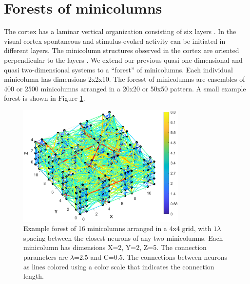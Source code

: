 \section{Forests of minicolumns}
The cortex has a laminar vertical organization consisting of six layers \citep{Strominger2012}.
In the visual cortex spontaneous and stimulus-evoked activity can be initiated in different layers\citep{Sakata2009}.
The minicolumn structures observed in the cortex are oriented perpendicular to the layers \citep{cruz2000}\citep{cruz2005}.
We extend our previous quasi one-dimensional and quasi two-dimensional systems to a ``forest'' of minicolumns.
Each individual minicolumn has dimensions 2x2x10.
The foresst of minicolumns are ensembles of 400 or 2500 minicolumns arranged in a 20x20 or 50x50 pattern.
A small example forest is shown in Figure \ref{fig:forest_structure}.
\begin{figure}[!htb]
 \caption{ Example forest of 16 minicolumns arranged in a 4x4 grid, with $1\lambda$ spacing between the closest neurons of any two minicolumns. 
           Each minicolumn has dimensions X=2, Y=2, Z=5. The connection parameters are $\lambda$=2.5 and C=0.5. 
           The connections between neurons as lines colored using a color scale that indicates the connection length. }
 \label{fig:forest_structure}
 \includegraphics[width=0.75\textwidth]{fig/Forest_Structure_A}
\end{figure}
\FloatBarrier

